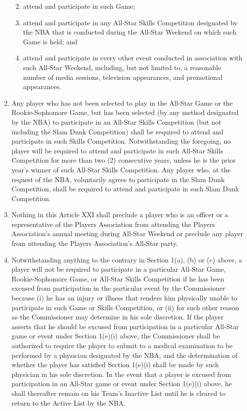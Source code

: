 \documentclass[
]{book}
\providecommand{\tightlist}{%
  \setlength{\itemsep}{0pt}\setlength{\parskip}{0pt}}
\begin{document}
\begin{enumerate}
  \begin{enumerate}
  \def\labelenumii{(\roman{enumii})}
  \tightlist
  \item
    attend and participate in such Game;
  \item
    attend and participate in any All-Star Skills Competition designated by the NBA that is conducted during the All-Star Weekend on which such Game is held; and
  \item
    attend and participate in every other event conducted in association with such All-Star Weekend, including, but not limited to, a reasonable number of media sessions, television appearances, and promotional appearances.
  \end{enumerate}
\item
  Any player who has not been selected to play in the All-Star Game or the Rookie-Sophomore Game, but has been selected (by any method designated by the NBA) to participate in an All-Star Skills Competition (but not including the Slam Dunk Competition) shall be required to attend and participate in such Skills Competition. Notwithstanding the foregoing, no player will be required to attend and participate in such All-Star Skills Competition for more than two (2) consecutive years, unless he is the prior year's winner of such All-Star Skills Competition. Any player who, at the request of the NBA, voluntarily agrees to participate in the Slam Dunk Competition, shall be required to attend and participate in such Slam Dunk Competition.
\item
  Nothing in this Article XXI shall preclude a player who is an officer or a representative of the Players Association from attending the Players Association's annual meeting during All-Star Weekend or preclude any player from attending the Players Association's All-Star party.
\item
  Notwithstanding anything to the contrary in Section 1(a), (b) or (c) above, a player will not be required to participate in a particular All-Star Game, Rookie-Sophomore Game, or All-Star Skills Competition if he has been excused from participation in the particular event by the Commissioner because (i) he has an injury or illness that renders him physically unable to participate in such Game or Skills Competition, or (ii) for such other reason as the Commissioner may determine in his sole discretion. If the player asserts that he should be excused from participation in a particular All-Star game or event under Section 1(e)(i) above, the Commissioner shall be authorized to require the player to submit to a medical examination to be performed by a physician designated by the NBA, and the determination of whether the player has satisfied Section 1(e)(i) shall be made by such physician in his sole discretion. In the event that a player is excused from participation in an All-Star game or event under Section 1(e)(i) above, he shall thereafter remain on his Team's Inactive List until he is cleared to return to the Active List by the NBA.

\end{enumerate}
\end{document}

